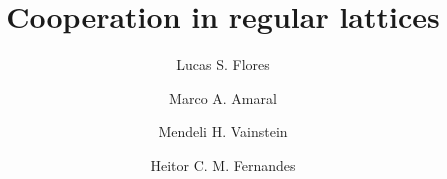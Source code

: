 \documentclass[5p,review]{elsarticle}
\begin{document}
\begin{frontmatter}

\title{Cooperation in regular lattices}



\author[label1]{Lucas S. Flores}
\author[label2]{Marco A. Amaral}
\author[label1]{Mendeli H. Vainstein}
\author[label1]{Heitor C. M. Fernandes}
\address[label1]{Instituto de Física, Universidade Federal do Rio Grande do Sul, CP 15051, CEP 91501-970 Porto Alegre - RS, Brazil}
\address[label2]{Instituto de Humanidades, Artes e Ciências, Universidade Federal do Sul da Bahia, CEP 45638-000, Teixeira de Freitas - BA, Brazil.}




\begin{abstract}


\end{abstract}
\end{frontmatter}
\end{document}
